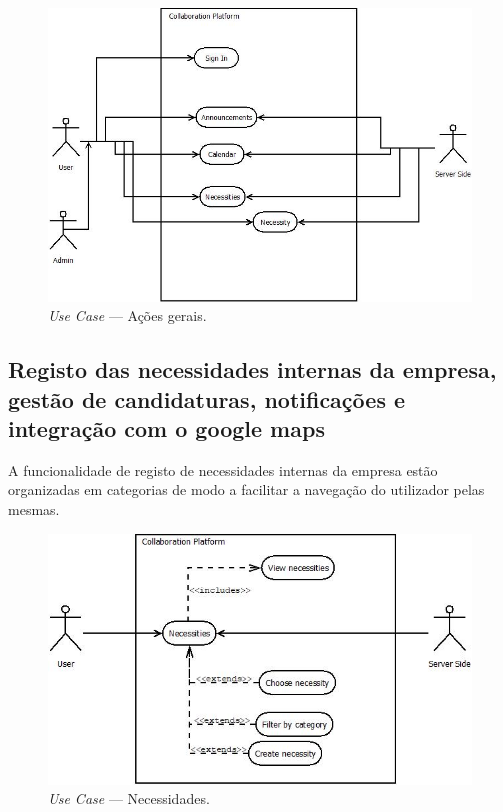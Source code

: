 \begin{figure}[H]
    \centering
    \includegraphics[scale=0.6]{figures/General Actions.jpeg}
    \caption{\textit{Use Case} --- Ações gerais.}\label{fig:uc:generalactions}
\end{figure}

\subsection{Registo das necessidades internas da empresa, gestão de candidaturas, notificações e integração com o google maps}\label{subsec:necessitiesCandidatesNotificationsGoogleMaps}

A funcionalidade de registo de necessidades internas da empresa estão organizadas em categorias de modo a facilitar a navegação do utilizador pelas mesmas.

\begin{figure}[H]
    \centering
    \includegraphics[scale=0.6]{figures/Necessities.jpeg}
    \caption{\textit{Use Case} --- Necessidades.}\label{fig:uc:necessities}
\end{figure}

